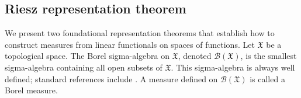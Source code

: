 \documentclass[11pt,a4paper]{article}
\newcommand{\RR}{\mathbb{R}}
\newcommand{\XF}{\mathfrak{X}}
\newcommand{\red}[1]{\textcolor{red}{#1}}
\newtheorem{definition}[theorem]{Definition}
\begin{document}

\subsection{Riesz representation theorem}

We present two foundational representation theorems that establish how to construct measures from linear functionals on spaces of functions. Let $\XF$ be a topological space. The Borel sigma-algebra on $\XF$, denoted $\mathcal{B}(\XF)$, is the smallest sigma-algebra containing all open subsets of $\XF$. This sigma-algebra is always well defined; standard references include \cite{bogachevMeasureTheory2007, evans2018measure, rudin1987real}. A measure defined on $\mathcal{B}(\XF)$ is called a Borel measure.
\end{document}
